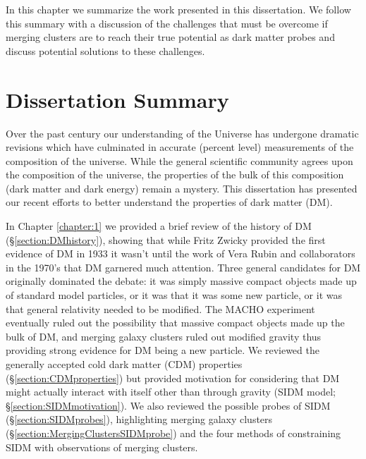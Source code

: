 \label{chapter:5}

In this chapter we summarize the work presented in this dissertation.  We follow this summary with a discussion of the challenges that must be overcome if merging clusters are to reach their true potential as dark matter probes and discuss potential solutions to these challenges.

\section{Dissertation Summary}

Over the past century our understanding of the Universe has undergone dramatic revisions which have culminated in accurate (percent level) measurements of the composition of the universe.
While the general scientific community agrees upon the composition of the universe, the properties of the bulk of this composition (dark matter and dark energy) remain a mystery.
This dissertation has presented our recent efforts to better understand the properties of dark matter (DM).

In Chapter \ref{chapter:1} we provided a brief review of the history of DM (\S\ref{section:DMhistory}), showing that while Fritz Zwicky provided the first evidence of DM in 1933 \citep{Zwicky:1933ub} it wasn't until the work of Vera Rubin and collaborators \citep{Rubin:1970gu} in the 1970's that DM garnered much attention.
Three general candidates for DM originally dominated the debate:
it was simply massive compact objects made up of standard model particles, or it was that it was some new particle, or it was that general relativity needed to be modified.
The MACHO experiment \citep{Alcock:2000bw} eventually ruled out the possibility that massive compact objects made up the bulk of DM, and merging galaxy clusters ruled out modified gravity \citep{Clowe:2006hr} thus providing strong evidence for DM being a new particle.
We reviewed the generally accepted cold dark matter (CDM) properties (\S\ref{section:CDMproperties}) but provided motivation for considering that DM might actually interact with itself other than through gravity (SIDM model; \S\ref{section:SIDMmotivation}).
We also reviewed the possible probes of SIDM (\S\ref{section:SIDMprobes}), highlighting  merging galaxy clusters (\S\ref{section:MergingClustersSIDMprobe}) and the four methods of constraining SIDM with observations of merging clusters.

